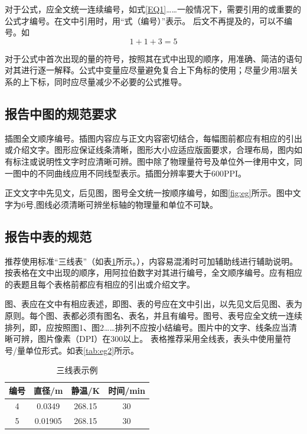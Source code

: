 \documentclass{thuemp}
\begin{document}
对于公式，应全文统一连续编号，如式\eqref{EQ1}……一般情况下，需要引用的或重要的公式才编号。在文中引用时，用“式（编号）”表示。
后文不再提及的，可以不编号。如
\begin{equation*}
1 + 1 + 3 = 5
\end{equation*}

对于公式中首次出现的量的符号，按照其在式中出现的顺序，用准确、简洁的语句对其进行逐一解释。公式中变量应尽量避免复合上下角标的使用；尽量少用3层关系的上下标，同时应尽量减少不必要的公式推导。

\subsection{报告中图的规范要求}
插图全文顺序编号。插图内容应与正文内容密切结合，每幅图前都应有相应的引出或介绍文字。图形应保证线条清晰，图形大小应适应版面要求，合理布局，图内如有标注或说明性文字时应清晰可辨。图中除了物理量符号及单位外一律用中文，同一图中的不同曲线应用不同线型表示。插图分辨率要大于600PPI。

正文文字中先见文，后见图，图号全文统一按顺序编号，如图\ref{fig:eg}所示。图中文字为6号,图线必须清晰可辨坐标轴的物理量和单位不可缺。




\subsection{报告中表的规范}
推荐使用标准“三线表”（如表\ref{tab:eg1}所示。），内容易混淆时可加辅助线进行辅助说明。按表格在文中出现的顺序，用阿拉伯数字对其进行编号，全文顺序编号。应有相应的表题且每个表格前都应有相应的引出或介绍文字。

图、表应在文中有相应表述，即图、表的号应在文中引出，以先见文后见图、表为原则。每个图、表都必须有图名、表名，并且有编号。图号、表号应全文统一连续排列，即，应按照图1、图2……排列不应按小结编号。图片中的文字、线条应当清晰可辨，图片像素（DPI）在300以上。
表格推荐采用全线表，表头中使用量符号/量单位形式。如表\ref{tab:eg2}所示。

\begin{table}[h]
\centering
\captionnamefont{\wuhao\bf\heiti}
\captiontitlefont{\wuhao\bf\heiti}
\caption{三线表示例} \label{tab:eg1}
\liuhao
\begin{tabular}{cccc}
\toprule
{编号} &  {直径}/\si{\metre} & {静温}/\si{\kelvin} & {时间}/min\\
\midrule 
4 & 0.0349 & 268.15 & 30\\
5 & 0.01905 & 268.15 & 30\\
\bottomrule
\end{tabular}
\end{table}
\end{document}
